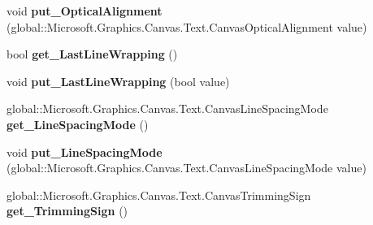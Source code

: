 \begin{DoxyCompactItemize}
\item 
\mbox{\label{class_microsoft_1_1_graphics_1_1_canvas_1_1_text_1_1_canvas_text_format_a425c22e2e7141efc0555fd442659f0b7}} 
void {\bfseries put\+\_\+\+Optical\+Alignment} (global\+::\+Microsoft.\+Graphics.\+Canvas.\+Text.\+Canvas\+Optical\+Alignment value)
\item 
\mbox{\label{class_microsoft_1_1_graphics_1_1_canvas_1_1_text_1_1_canvas_text_format_aa855b7b2956b2494052e9cdd55b02fb4}} 
bool {\bfseries get\+\_\+\+Last\+Line\+Wrapping} ()
\item 
\mbox{\label{class_microsoft_1_1_graphics_1_1_canvas_1_1_text_1_1_canvas_text_format_a3a6a2fc656c46147b1092b31a50db0c1}} 
void {\bfseries put\+\_\+\+Last\+Line\+Wrapping} (bool value)
\item 
\mbox{\label{class_microsoft_1_1_graphics_1_1_canvas_1_1_text_1_1_canvas_text_format_a27e6bacad5baec82340ced77aff91b82}} 
global\+::\+Microsoft.\+Graphics.\+Canvas.\+Text.\+Canvas\+Line\+Spacing\+Mode {\bfseries get\+\_\+\+Line\+Spacing\+Mode} ()
\item 
\mbox{\label{class_microsoft_1_1_graphics_1_1_canvas_1_1_text_1_1_canvas_text_format_a886014158def86d2f1cff0ef5008817f}} 
void {\bfseries put\+\_\+\+Line\+Spacing\+Mode} (global\+::\+Microsoft.\+Graphics.\+Canvas.\+Text.\+Canvas\+Line\+Spacing\+Mode value)
\item 
\mbox{\label{class_microsoft_1_1_graphics_1_1_canvas_1_1_text_1_1_canvas_text_format_ad94de231bbaf0d4dc6bb416b81343159}} 
global\+::\+Microsoft.\+Graphics.\+Canvas.\+Text.\+Canvas\+Trimming\+Sign {\bfseries get\+\_\+\+Trimming\+Sign} ()
\item 
\mbox{\label{class_microsoft_1_1_graphics_1_1_canvas_1_1_text_1_1_canvas_text_format_a8066e8fae4c8e5707dfa8324ea7faf5b}} 

\end{DoxyCompactItemize}
